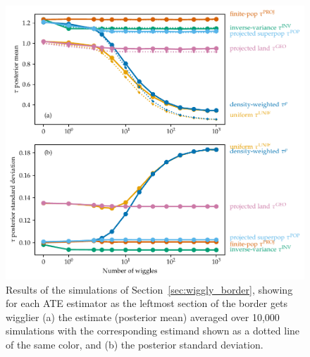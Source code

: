 \documentclass[letter]{article}
\makeatletter
\def\maxwidth{\ifdim\Gin@nat@width>\linewidth\linewidth
\else\Gin@nat@width\fi}
\let\Oldincludegraphics\includegraphics
\renewcommand{\includegraphics}[1]{\Oldincludegraphics[width=0.9\maxwidth]{#1}}
\makeatother
\begin{document}
    	\begin{figure}
\centering
\includegraphics{../figures/wiggly_boundaries_posteriors.pdf}
\caption{\label{fig:wiggly_boundaries_posteriors} Results of the simulations of Section~\ref{sec:wiggly_border}, showing for each ATE estimator as the leftmost section of the border gets wigglier (a) the estimate (posterior mean) averaged over 10,000 simulations with the corresponding estimand shown as a dotted line of the same color, and (b) the posterior standard deviation.}
\end{figure}
    
\end{document}
